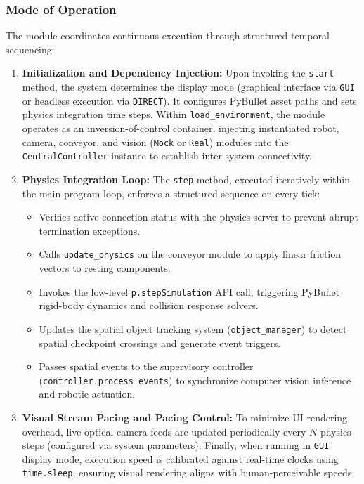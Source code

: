 \documentclass{article}
\begin{document}
\subsubsection{Mode of Operation}
The module coordinates continuous execution through structured temporal sequencing:

\begin{enumerate}
	\item \textbf{Initialization and Dependency Injection:}
	Upon invoking the \texttt{start} method, the system determines the display mode (graphical interface via \texttt{GUI} or headless execution via \texttt{DIRECT}). It configures PyBullet asset paths and sets physics integration time steps. Within \texttt{load\_environment}, the module operates as an inversion-of-control container, injecting instantiated robot, camera, conveyor, and vision (\texttt{Mock} or \texttt{Real}) modules into the \texttt{CentralController} instance to establish inter-system connectivity.
	
	\item \textbf{Physics Integration Loop:}
	The \texttt{step} method, executed iteratively within the main program loop, enforces a structured sequence on every tick:
	\begin{itemize}
		\item Verifies active connection status with the physics server to prevent abrupt termination exceptions.
		\item Calls \texttt{update\_physics} on the conveyor module to apply linear friction vectors to resting components.
		\item Invokes the low-level \texttt{p.stepSimulation} API call, triggering PyBullet rigid-body dynamics and collision response solvers.
		\item Updates the spatial object tracking system (\texttt{object\_manager}) to detect spatial checkpoint crossings and generate event triggers.
		\item Passes spatial events to the supervisory controller (\texttt{controller.process\_events}) to synchronize computer vision inference and robotic actuation.
	\end{itemize}
	
	\item \textbf{Visual Stream Pacing and Pacing Control:}
	To minimize UI rendering overhead, live optical camera feeds are updated periodically every $N$ physics steps (configured via system parameters). Finally, when running in \texttt{GUI} display mode, execution speed is calibrated against real-time clocks using \texttt{time.sleep}, ensuring visual rendering aligns with human-perceivable speeds.
\end{enumerate}
\end{document}
